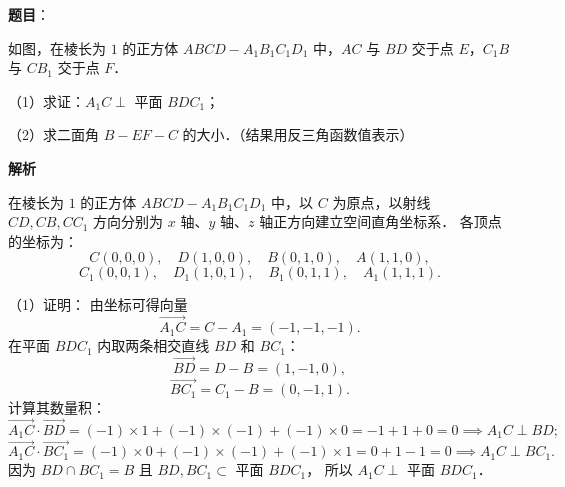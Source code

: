 \begin{answer}

\textbf{题目}：

如图，在棱长为 $1$ 的正方体 $ABCD - A_1B_1C_1D_1$ 中，$AC$ 与 $BD$ 交于点 $E$，$C_1B$ 与 $CB_1$ 交于点 $F$．

（1）求证：$A_1C \perp$ 平面 $BDC_1$；

（2）求二面角 $B - EF - C$ 的大小．（结果用反三角函数值表示）
\nopagebreak[4]
\begin{center}\end{center}
\nopagebreak[4]
\textbf{解析}
\nopagebreak[4]
\begin{center}\end{center}
\nopagebreak[4]
在棱长为 $1$ 的正方体 $ABCD - A_1B_1C_1D_1$ 中，以 $C$ 为原点，以射线 $CD, CB, CC_1$ 方向分别为 $x$ 轴、$y$ 轴、$z$ 轴正方向建立空间直角坐标系．
各顶点的坐标为：
\nopagebreak[4]
\[
C(0, 0, 0), \quad D(1, 0, 0), \quad B(0, 1, 0), \quad A(1, 1, 0),
\]
\nopagebreak[4]
\[
C_1(0, 0, 1), \quad D_1(1, 0, 1), \quad B_1(0, 1, 1), \quad A_1(1, 1, 1).
\]

（1）证明：
由坐标可得向量
\nopagebreak[4]
\[
\overrightarrow{A_1C} = C - A_1 = (-1, -1, -1).
\]
在平面 $BDC_1$ 内取两条相交直线 $BD$ 和 $BC_1$：
\nopagebreak[4]
\[
\overrightarrow{BD} = D - B = (1, -1, 0),
\]
\nopagebreak[4]
\[
\overrightarrow{BC_1} = C_1 - B = (0, -1, 1).
\]
计算其数量积：
\nopagebreak[4]
\[
\overrightarrow{A_1C} \cdot \overrightarrow{BD} = (-1) \times 1 + (-1) \times (-1) + (-1) \times 0 = -1 + 1 + 0 = 0 \implies A_1C \perp BD;
\]
\nopagebreak[4]
\[
\overrightarrow{A_1C} \cdot \overrightarrow{BC_1} = (-1) \times 0 + (-1) \times (-1) + (-1) \times 1 = 0 + 1 - 1 = 0 \implies A_1C \perp BC_1.
\]
因为 $BD \cap BC_1 = B$ 且 $BD, BC_1 \subset$ 平面 $BDC_1$，
所以 $A_1C \perp$ 平面 $BDC_1$．


\end{answer}
